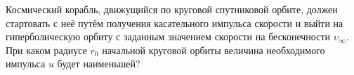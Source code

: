 Космический корабль, движущийся по круговой спутниковой орбите,
должен стартовать с неё путём получения касательного импульса скорости
и выйти на гиперболическую орбиту с заданным значением скорости
на бесконечности $\upsilon _{\infty}$.
При каком радиусе $r_0$ начальной круговой орбиты
величина необходимого импульса $u$ будет наименьшей?

